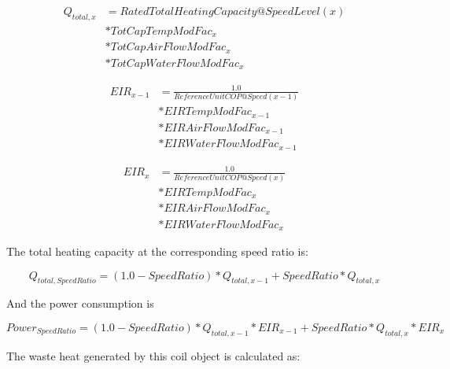 \begin{equation}
  \begin{array}{rl}
    Q_{total,x} &= RatedTotalHeatingCapacity@SpeedLevel\left( x \right) \\
                &* TotCapTempModFac_x \\
                &* TotCapAirFlowModFac_x \\
                &* TotCapWaterFlowModFac_x 
 \end{array}
\end{equation}

\begin{equation}
  \begin{array}{rl}
    EIR_{x - 1} &= \frac{1.0}{ReferenceUnitCOP@Speed(x - 1)} \\
                &* EIRTempModFac_{x - 1} \\
                &* EIRAirFlowModFac_{x - 1} \\
                &* EIRWaterFlowModFac_{x - 1}
  \end{array}
\end{equation}

\begin{equation}
  \begin{array}{rl}
    EIR_x &= \frac{1.0}{ReferenceUnitCOP@Speed(x)} \\
                &* EIRTempModFac_{x} \\
                &* EIRAirFlowModFac_{x} \\
                &* EIRWaterFlowModFac_{x}
  \end{array}
\end{equation}

The total heating capacity at the corresponding speed ratio is:

\begin{equation}
{Q_{total,SpeedRatio}} = \left( {1.0 - SpeedRatio} \right)*{Q_{total,x - 1}} + SpeedRatio*{Q_{total,x}}
\end{equation}

And the power consumption is

\begin{equation}
Powe{r_{SpeedRatio}} = \left( {1.0 - SpeedRatio} \right)*{Q_{total,x - 1}}*EI{R_{x - 1}} + SpeedRatio*{Q_{total,x}}*EI{R_x}
\end{equation}

The waste heat generated by this coil object is calculated as:

